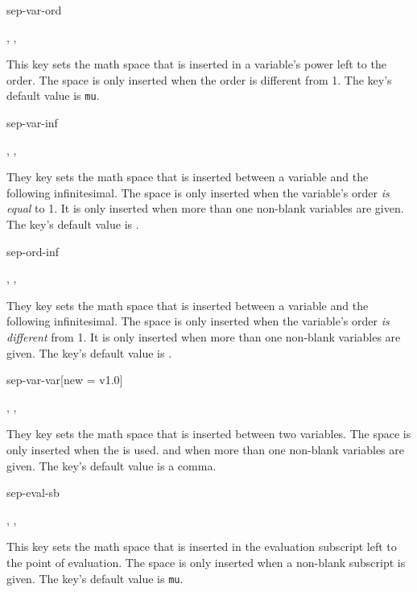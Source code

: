 	\begin{option}{sep-var-ord}
		\begin{values}[default = 0]
			, , 
		\end{values}
		This key sets the math space that is inserted in a variable's power left to the order. The space is only inserted when the order is different from \num{1}. The key's default value is  \texttt{mu}.
	\end{option}
	
	\begin{option}{sep-var-inf}
		\begin{values}[default = \cs{mathop}\{\}\cs{!}]
			, , 
		\end{values}
		They key sets the math space that is inserted between a variable and the following infinitesimal. The space is only inserted when the variable's order \emph{is equal} to \num{1}. It is only inserted when more than one non-blank variables are given. The key's default value is .
	\end{option}
	
	\begin{option}{sep-ord-inf}
		\begin{values}[default = \cs{mathop}\{\}\cs{!}]
			, , 
		\end{values}
		They key sets the math space that is inserted between a variable and the following infinitesimal. The space is only inserted when the variable's order \emph{is different} from \num{1}. It is only inserted when more than one non-blank variables are given. The key's default value is .
	\end{option}
	
	\begin{option}{sep-var-var}[new = v1.0]
		\begin{values}[default = {{,}}]
			, , 
		\end{values}
		They key sets the math space that is inserted between two variables. The space is only inserted when the  is used. and when more than one non-blank variables are given. The key's default value is a comma.
	\end{option}
	
	\clearpage
	
	\begin{option}{sep-eval-sb}
		\begin{values}[default = 0]
			, , 
		\end{values}
		This key sets the math space that is inserted in the evaluation subscript left to the point of evaluation. The space is only inserted when a non-blank subscript is given. The key's default value is  \texttt{mu}.
	\end{option}
	
